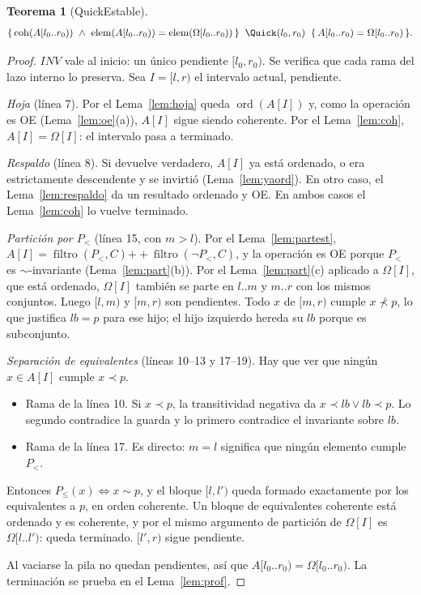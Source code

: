 \documentclass[10pt,a4paper]{article}
\theoremstyle{plain}
\newtheorem{teorema}{Teorema}[section]
\theoremstyle{definition}
\theoremstyle{remark}
\newcommand{\lt}{\prec}
\newcommand{\nlt}{\not\prec}
\newcommand{\eqv}{\sim}
\newcommand{\cat}{\mathbin{+\!\!+}}
\newcommand{\elems}{\operatorname{elem}}
\newcommand{\filt}{\operatorname{filtro}}
\newcommand{\hoare}[3]{\{\,#1\,\}\;\;#2\;\;\{\,#3\,\}}
\newcommand{\sortd}{\operatorname{ord}}
\newcommand{\coh}{\operatorname{coh}}
\begin{document}
\begin{teorema}[QuickEstable]\label{thm:quick}
\[
\hoare{\coh(A[l_0..r_0))\ \wedge\ \elems(A[l_0..r_0))=\elems(\Omega[l_0..r_0))}{\Quick(l_0,r_0)}{A[l_0..r_0)=\Omega[l_0..r_0)}.
\]
\end{teorema}
\begin{proof}
$\mathit{INV}$ vale al inicio: un único pendiente $[l_0,r_0)$. Se verifica que cada
rama del lazo interno lo preserva. Sea $I=[l,r)$ el intervalo actual, pendiente.

\emph{Hoja} (línea 7). Por el Lema~\ref{lem:hoja} queda $\sortd(A[I])$ y, como la
operación es OE (Lema~\ref{lem:oe}(a)), $A[I]$ sigue siendo coherente. Por el
Lema~\ref{lem:coh}, $A[I]=\Omega[I]$: el intervalo pasa a terminado.

\emph{Respaldo} (línea 8). Si \Ordenado devuelve verdadero, $A[I]$ ya está ordenado,
o era estrictamente descendente y se invirtió (Lema~\ref{lem:yaord}). En otro caso,
el Lema~\ref{lem:respaldo} da un resultado ordenado y OE. En ambos casos el
Lema~\ref{lem:coh} lo vuelve terminado.

\emph{Partición por $P_<$} (línea 15, con $m>l$). Por el Lema~\ref{lem:partest},
$A[I]=\filt(P_<,C)\cat\filt(\neg P_<,C)$, y la operación es OE porque $P_<$ es
$\eqv$-invariante (Lema~\ref{lem:part}(b)). Por el Lema~\ref{lem:part}(c) aplicado a
$\Omega[I]$, que está ordenado, $\Omega[I]$ también se parte en $l..m$ y $m..r$ con
los mismos conjuntos. Luego $[l,m)$ y $[m,r)$ son pendientes. Todo $x$ de $[m,r)$
cumple $x\nlt p$, lo que justifica $\mathit{lb}=p$ para ese hijo; el hijo izquierdo
hereda su $\mathit{lb}$ porque es subconjunto.

\emph{Separación de equivalentes} (líneas 10--13 y 17--19). Hay que ver que ningún
$x\in A[I]$ cumple $x\lt p$.
\begin{itemize}[nosep]
\item Rama de la línea 10. Si $x\lt p$, la transitividad negativa da
  $x\lt\mathit{lb}\vee\mathit{lb}\lt p$. Lo segundo contradice la guarda y lo primero
  contradice el invariante sobre $\mathit{lb}$.
\item Rama de la línea 17. Es directo: $m=l$ significa que ningún elemento cumple
  $P_<$.
\end{itemize}
Entonces $P_\le(x)\iff x\eqv p$, y el bloque $[l,l')$ queda formado exactamente por
los equivalentes a $p$, en orden coherente. Un bloque de equivalentes coherente está
ordenado y es coherente, y por el mismo argumento de partición de $\Omega[I]$ es
$\Omega[l..l')$: queda terminado. $[l',r)$ sigue pendiente.

Al vaciarse la pila no quedan pendientes, así que $A[l_0..r_0)=\Omega[l_0..r_0)$. La
terminación se prueba en el Lema~\ref{lem:prof}.
\end{proof}
\end{document}
